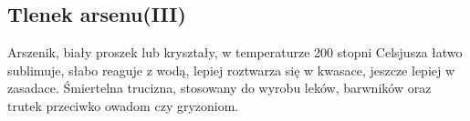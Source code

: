 \subsection{Tlenek arsenu(III) }
Arszenik, biały proszek lub kryształy, w temperaturze 200 stopni Celsjusza łatwo sublimuje, słabo reaguje z wodą, lepiej roztwarza się w kwasace, jeszcze lepiej w zasadace.
Śmiertelna trucizna, stosowany do wyrobu leków, barwników oraz trutek przeciwko owadom czy gryzoniom.

